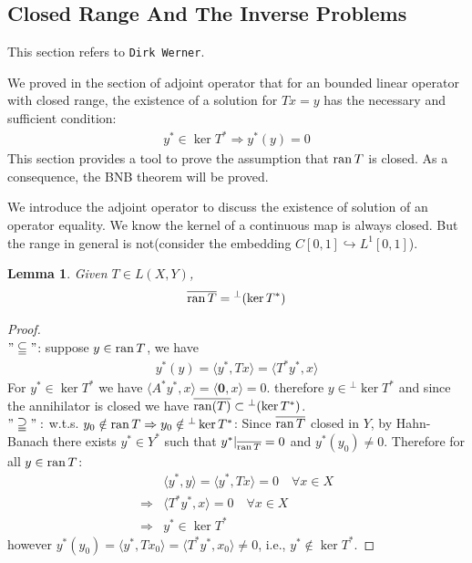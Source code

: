 \documentclass[a4paper,11pt,fleqn]{book}
\newtheorem{lemma}[theorem]{Lemma}
\theoremstyle{definition}
\theoremstyle{remark}
\begin{document}
\subsection{Closed Range And The Inverse Problems}
This section refers to \texttt{Dirk Werner}. \par 
 We proved in the section of adjoint operator that for an bounded linear operator with closed range, the existence of a solution for $Tx = y$ has the necessary and sufficient condition:
\begin{align*}
	y^* \in \ker T^* \Rightarrow y^*(y) = 0
\end{align*}
This section provides a tool to prove the assumption that $\operatorname{ran} T$ is closed. As a consequence, the BNB theorem will be proved.

 We introduce the adjoint operator to discuss the existence of solution of an operator equality. We know the kernel of a continuous map is always closed. But the range in general is not(consider the embedding $C[0, 1] \hookrightarrow L^1[0, 1]$).
 

 
\begin{lemma}
Given $T \in L(X, Y)$,
	\begin{align*}
		\overline{\operatorname{ran} T} = {}^\perp (\ker T^*)
	\end{align*}
\end{lemma}
\begin{proof}
\quad\\
$"\subseteqq"$: suppose $y \in \operatorname{ran} T$, we have
\begin{align*}
	y^*(y) = \langle y^*, T x \rangle = \langle T^* y ^*, x\rangle
\end{align*}
For $y^* \in \ker T^*$ we have $\langle A^* y^*, x \rangle = \langle \textbf{0}, x \rangle = 0$. therefore $y \in {}^\perp \ker T^*$ and since the annihilator is closed we have $\overline{\operatorname{ran}(T)} \subset {}^\perp (\ker T^*)$. \\
$"\supseteqq":$ w.t.s. $y_0 \notin \operatorname{ran} T \Rightarrow y_0 \notin {}^\perp \ker T^*$: Since $\overline{\operatorname{ran} T}$ closed in $Y$, by Hahn-Banach there exists $y^* \in Y^*$ such that $y^*|_{\overline{\operatorname{ran} T}} = 0$ and $y^*(y_0) \neq 0$. Therefore for all $y \in \operatorname{ran} T$:
\begin{align*}
	&\langle y^*, y\rangle =  \langle y^*, Tx \rangle = 0 \quad \forall x \in X \\
	\Rightarrow & \langle T^* y^*, x \rangle = 0  \quad \forall x \in X\\
	\Rightarrow & y^* \in \ker T^*
\end{align*}
however $y^*(y_0) = \langle y^*, Tx_0 \rangle = \langle T^* y^*, x_0 \rangle  \neq 0 $, i.e., $y^* \notin \ker T^*$. \Lightning
\end{proof}
\end{document}

